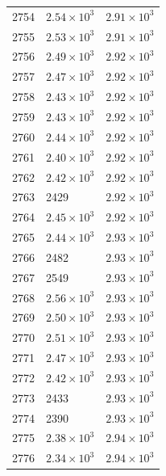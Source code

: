 \begin{table}[H]
\begin{tabular}{lll}
2754 & $\displaystyle 2.54 \times 10^{3}$ & $\displaystyle 2.91 \times 10^{3}$ \\
2755 & $\displaystyle 2.53 \times 10^{3}$ & $\displaystyle 2.91 \times 10^{3}$ \\
2756 & $\displaystyle 2.49 \times 10^{3}$ & $\displaystyle 2.92 \times 10^{3}$ \\
2757 & $\displaystyle 2.47 \times 10^{3}$ & $\displaystyle 2.92 \times 10^{3}$ \\
2758 & $\displaystyle 2.43 \times 10^{3}$ & $\displaystyle 2.92 \times 10^{3}$ \\
2759 & $\displaystyle 2.43 \times 10^{3}$ & $\displaystyle 2.92 \times 10^{3}$ \\
2760 & $\displaystyle 2.44 \times 10^{3}$ & $\displaystyle 2.92 \times 10^{3}$ \\
2761 & $\displaystyle 2.40 \times 10^{3}$ & $\displaystyle 2.92 \times 10^{3}$ \\
2762 & $\displaystyle 2.42 \times 10^{3}$ & $\displaystyle 2.92 \times 10^{3}$ \\
2763 & 2429 & $\displaystyle 2.92 \times 10^{3}$ \\
2764 & $\displaystyle 2.45 \times 10^{3}$ & $\displaystyle 2.92 \times 10^{3}$ \\
2765 & $\displaystyle 2.44 \times 10^{3}$ & $\displaystyle 2.93 \times 10^{3}$ \\
2766 & 2482 & $\displaystyle 2.93 \times 10^{3}$ \\
2767 & 2549 & $\displaystyle 2.93 \times 10^{3}$ \\
2768 & $\displaystyle 2.56 \times 10^{3}$ & $\displaystyle 2.93 \times 10^{3}$ \\
2769 & $\displaystyle 2.50 \times 10^{3}$ & $\displaystyle 2.93 \times 10^{3}$ \\
2770 & $\displaystyle 2.51 \times 10^{3}$ & $\displaystyle 2.93 \times 10^{3}$ \\
2771 & $\displaystyle 2.47 \times 10^{3}$ & $\displaystyle 2.93 \times 10^{3}$ \\
2772 & $\displaystyle 2.42 \times 10^{3}$ & $\displaystyle 2.93 \times 10^{3}$ \\
2773 & 2433 & $\displaystyle 2.93 \times 10^{3}$ \\
2774 & 2390 & $\displaystyle 2.93 \times 10^{3}$ \\
2775 & $\displaystyle 2.38 \times 10^{3}$ & $\displaystyle 2.94 \times 10^{3}$ \\
2776 & $\displaystyle 2.34 \times 10^{3}$ & $\displaystyle 2.94 \times 10^{3}$ \\

\end{tabular}
\end{table}
